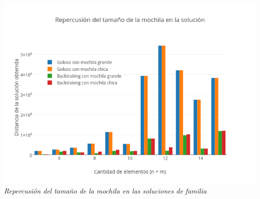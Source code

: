 \vspace*{0.3cm} \vspace*{0.3cm}
  \begin{center}
\includegraphics[scale=0.60]{./EJ2/familiaMochila.png}
\\{\textit{Repercusión del tamaño de la mochila en las soluciones de familia}}
  \end{center}
  \vspace*{0.3cm}
  \begin{figure} [!ht]
 \centering
    \label{fig:comparativo1}
    \label{fig:comparativo2}
    \end{figure}
   

